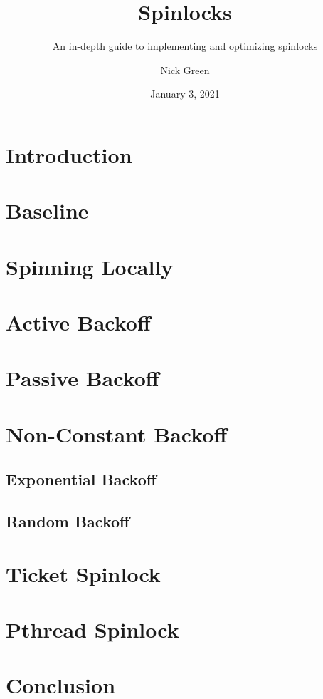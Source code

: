 \documentclass[11pt,fancy,authoryear]{elegantbook}
\title{Spinlocks}
\subtitle{An in-depth guide to implementing and optimizing spinlocks}
\author{Nick Green}
\institute{CoffeeBeforeArch}
\date{January 3, 2021}
\begin{document}
\maketitle

\frontmatter
\tableofcontents

\mainmatter

\chapter{Introduction}

\chapter{Baseline}

\chapter{Spinning Locally}

\chapter{Active Backoff}

\chapter{Passive Backoff}

\chapter{Non-Constant Backoff}

\section{Exponential Backoff}

\section{Random Backoff}

\chapter{Ticket Spinlock}

\chapter{Pthread Spinlock}

\chapter{Conclusion}
\end{document}
